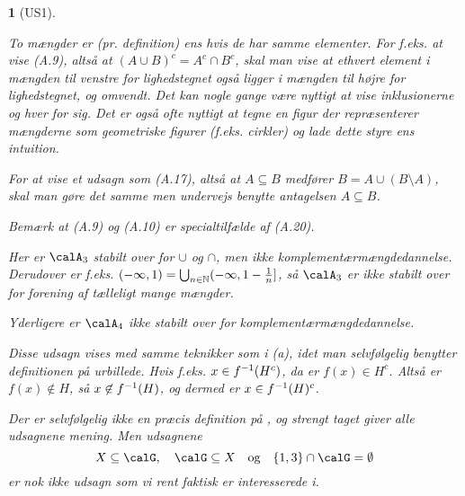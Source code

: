 \documentclass[a4paper, 11pt, article, danish, oneside]{memoir}
\title{\doctitle}
\author{\docauthor}
\newcommand{\naturals}{\mathbb{N}}
\DeclarePairedDelimiter{\auxdelimparen}{(}{)}
\newcommand*\union\cup
\newcommand*\intersect\cap
\DeclareMathOperator*{\smallbigcup}{\textstyle\bigcup}
\DeclareMathOperator*{\bigunion}{\mathchoice
    {\smallbigcup}%
    {\bigcup}%
    {\bigcup}%
    {\bigcup}%
}
\newcommand{\preim}[2][]{^{-1}\auxdelimparen[#1]{#2}}
\newcommand{\pencilsymbol}{\raisebox{-2pt}{\normalfont\PencilLeft}}
\theoremstyle{changedotcustomnumber}
\theoremstyle{changedotbreakcustomnumber}
\newtheorem{opgavebreak}{\pencilsymbol}
\begin{document}
\maketitle

\begin{opgavebreak}[US1]
\begin{solutionsec}
    \item To mængder er (pr. definition) ens hvis de har samme elementer. For f.eks. at vise (A.9), altså at $(A \union B)^c = A^c \intersect B^c$, skal man vise at ethvert element i mængden til venstre for lighedstegnet også ligger i mængden til højre for lighedstegnet, og omvendt. Det kan nogle gange være nyttigt at vise inklusionerne \textquote{$\subseteq$} og \textquote{$\supseteq$} hver for sig. Det er også ofte nyttigt at tegne en figur der repræsenterer mængderne som geometriske figurer (f.eks. cirkler) og lade dette styre ens intuition.

    For at vise et udsagn som (A.17), altså at $A \subseteq B$ medfører $B = A \union (B \setminus A)$, skal man gøre det samme men undervejs benytte antagelsen $A \subseteq B$.

    Bemærk at (A.9) og (A.10) er specialtilfælde af (A.20).

    \item Her er $\calA_3$ stabilt over for $\union$ og $\intersect$, men ikke komplementærmængdedannelse. Derudover er f.eks. $(-\infty,1) = \bigunion_{n \in \naturals} (-\infty, 1-\frac{1}{n}]$, så $\calA_3$ er ikke stabilt over for forening af tælleligt mange mængder.

    Yderligere er $\calA_4$ ikke stabilt over for komplementærmængdedannelse.

    \item Disse udsagn vises med samme teknikker som i (a), idet man selvfølgelig benytter definitionen på urbillede. Hvis f.eks. $x \in f\preim{H^c}$, da er $f(x) \in H^c$. Altså er $f(x) \not\in H$, så $x \not\in f\preim{H}$, og dermed er $x \in f\preim{H}^c$.

    \item Der er selvfølgelig ikke en præcis definition på , og strengt taget giver alle udsagnene mening. Men udsagnene
    \begin{equation*}
        X \subseteq \calG,
        \quad
        \calG \subseteq X
        \quad \text{og} \quad
        \{1,3\} \intersect \calG = \emptyset
    \end{equation*}
    er nok ikke udsagn som vi rent faktisk er interesserede i.
\end{solutionsec}
\end{opgavebreak}
\end{document}
